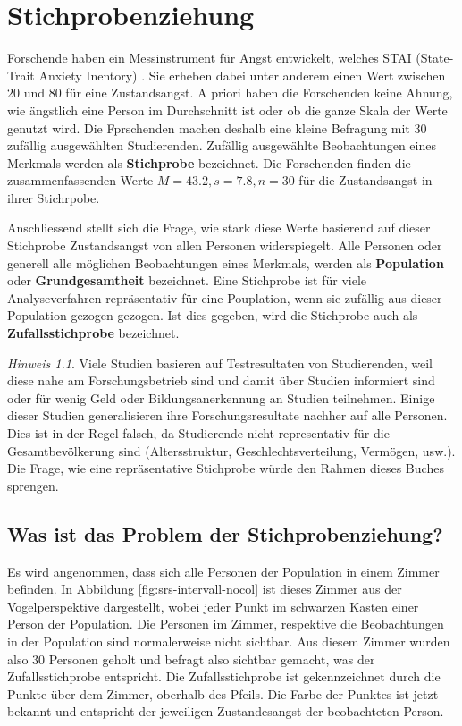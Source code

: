 \documentclass[
]{book}
\theoremstyle{definition}
\theoremstyle{definition}
\theoremstyle{definition}
\theoremstyle{definition}
\theoremstyle{remark}
\newtheorem*{remark}{Hinweis}
\begin{document}
\chapter{Stichprobenziehung}\label{stichprobenziehung}

Forschende haben ein Messinstrument für Angst entwickelt, welches STAI (State-Trait Anxiety Inentory) \citep{spielberger1983manual}. Sie erheben dabei unter anderem einen Wert zwischen \(20\) und \(80\) für eine Zustandsangst. A priori haben die Forschenden keine Ahnung, wie ängstlich eine Person im Durchschnitt ist oder ob die ganze Skala der Werte genutzt wird. Die Fprschenden machen deshalb eine kleine Befragung mit \(30\) zufällig ausgewählten Studierenden. Zufällig ausgewählte Beobachtungen eines Merkmals werden als \textbf{Stichprobe} bezeichnet. Die Forschenden finden die zusammenfassenden Werte \(M=43.2, s = 7.8, n = 30\) für die Zustandsangst in ihrer Stichrpobe.

Anschliessend stellt sich die Frage, wie stark diese Werte basierend auf dieser Stichprobe Zustandsangst von allen Personen widerspiegelt. Alle Personen oder generell alle möglichen Beobachtungen eines Merkmals, werden als \textbf{Population} oder \textbf{Grundgesamtheit} bezeichnet. Eine Stichprobe ist für viele Analyseverfahren repräsentativ für eine Pouplation, wenn sie zufällig aus dieser Population gezogen gezogen. Ist dies gegeben, wird die Stichprobe auch als \textbf{Zufallsstichprobe} bezeichnet.

\begin{remark}
Viele Studien basieren auf Testresultaten von Studierenden, weil diese nahe am Forschungsbetrieb sind und damit über Studien informiert sind oder für wenig Geld oder Bildungsanerkennung an Studien teilnehmen. Einige dieser Studien generalisieren ihre Forschungsresultate nachher auf alle Personen. Dies ist in der Regel falsch, da Studierende nicht representativ für die Gesamtbevölkerung sind (Altersstruktur, Geschlechtsverteilung, Vermögen, usw.). Die Frage, wie eine repräsentative Stichprobe würde den Rahmen dieses Buches sprengen.
\end{remark}

\section{Was ist das Problem der Stichprobenziehung?}\label{stichprobenziehung-problem}

Es wird angenommen, dass sich alle Personen der Population in einem Zimmer befinden. In Abbildung \ref{fig:srs-intervall-nocol} ist dieses Zimmer aus der Vogelperspektive dargestellt, wobei jeder Punkt im schwarzen Kasten einer Person der Population. Die Personen im Zimmer, respektive die Beobachtungen in der Population sind normalerweise nicht sichtbar. Aus diesem Zimmer wurden also 30 Personen geholt und befragt also sichtbar gemacht, was der Zufallsstichprobe entspricht. Die Zufallsstichprobe ist gekennzeichnet durch die Punkte über dem Zimmer, oberhalb des Pfeils. Die Farbe der Punktes ist jetzt bekannt und entspricht der jeweiligen Zustandesangst der beobachteten Person.
\end{document}
